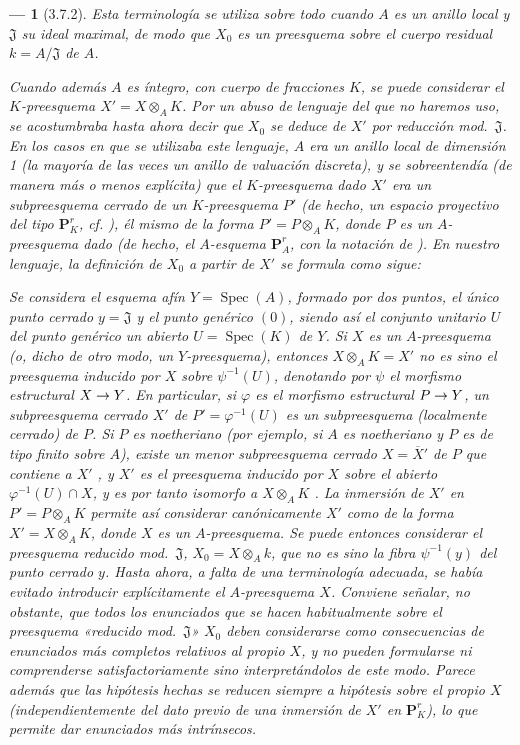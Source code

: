 \documentclass[oneside]{amsart}
\theoremstyle{ega-env-style}
\newtheorem*{env}{---}
\theoremstyle{ega-thm-env-style}
\theoremstyle{ega-defn-env-style}
\renewcommand{\to}{\mathchoice{\longrightarrow}{\rightarrow}{\rightarrow}{\rightarrow}}
\newcommand{\oldpage}[2][]{{\marginnote{\normalfont{\textbf{#1}~|~#2}}}\ignorespaces}
\let\EGAOriginalLabel\label
\renewcommand{\label}[1]{\phantomsection\EGAOriginalLabel{#1}}
\begin{document}
\begin{env}[3.7.2]
\label{I.3.7.2}
Esta terminología se utiliza sobre todo cuando $A$ es un \emph{anillo local} y $\mathfrak{J}$ su ideal maximal, de modo que $X_0$ es un preesquema sobre el cuerpo residual $k=A/\mathfrak{J}$ de $A$.

Cuando además $A$ es íntegro, con cuerpo de fracciones $K$, se puede considerar el $K$-preesquema $X'=X\otimes_A K$.
Por un abuso de lenguaje del que no haremos uso, se acostumbraba hasta ahora decir que $X_0$ se \emph{deduce de $X'$} por reducción mod.~$\mathfrak{J}$.
En los casos en que se utilizaba este lenguaje, $A$ era un anillo local de dimensión 1 (la mayoría de las veces un anillo de valuación discreta), y se sobreentendía (de manera más o menos explícita) que el $K$-preesquema dado $X'$ era un subpreesquema cerrado de un $K$-preesquema $P'$ (de hecho, un espacio proyectivo del tipo $\mathbf{P}_K^r$, cf. ), él mismo de la forma $P'=P\otimes_A K$, donde $P$ es un $A$-preesquema dado (de hecho, el $A$-esquema $\mathbf{P}_A^r$, con la notación de ).
En nuestro lenguaje, la definición de $X_0$ a partir de $X'$ se formula como sigue:

Se considera el esquema afín $Y=\operatorname{Spec}(A)$, formado por dos puntos, el único punto cerrado
\oldpage[I]{119}
$y=\mathfrak{J}$ y el punto genérico $(0)$, siendo así el conjunto unitario $U$ del punto genérico un abierto $U=\operatorname{Spec}(K)$ de $Y$.
Si $X$ es un $A$-preesquema (o, dicho de otro modo, un $Y$-preesquema), entonces $X\otimes_A K=X'$ no es sino el preesquema inducido por $X$ sobre $\psi^{-1}(U)$, denotando por $\psi$ el morfismo estructural $X\to Y$.
En particular, si $\varphi$ es el morfismo estructural $P\to Y$, un subpreesquema cerrado $X'$ de $P'=\varphi^{-1}(U)$ es un subpreesquema (localmente cerrado) de $P$.
Si $P$ es noetheriano (por ejemplo, si $A$ es noetheriano y $P$ es de tipo finito sobre $A$), existe un menor subpreesquema cerrado $X=\overline{X}'$ de $P$ que contiene a $X'$ , y $X'$ es el preesquema inducido por $X$ sobre el abierto $\varphi^{-1}(U)\cap X$, y es por tanto isomorfo a $X\otimes_A K$ .
\emph{La inmersión de $X'$ en $P'=P\otimes_A K$ permite así considerar canónicamente $X'$ como de la forma $X'=X\otimes_A K$, donde $X$ es un $A$-preesquema.}
Se puede entonces considerar el preesquema reducido mod.~$\mathfrak{J}$, $X_0=X\otimes_A k$, que no es sino la fibra $\psi^{-1}(y)$ del punto cerrado $y$.
Hasta ahora, a falta de una terminología adecuada, se había evitado introducir explícitamente el $A$-preesquema $X$.
Conviene señalar, no obstante, que todos los enunciados que se hacen habitualmente sobre el preesquema «reducido mod.~$\mathfrak{J}$» $X_0$ deben considerarse como consecuencias de enunciados más completos relativos al propio $X$, y no pueden formularse ni comprenderse satisfactoriamente sino interpretándolos de este modo.
Parece además que las hipótesis hechas se reducen siempre a hipótesis sobre el propio $X$ (independientemente del dato previo de una inmersión de $X'$ en $\mathbf{P}_K^r$), lo que permite dar enunciados más intrínsecos.
\end{env}
\end{document}
